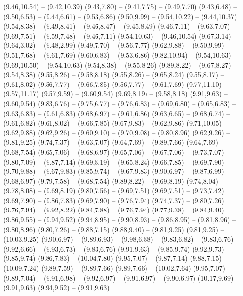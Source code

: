 {  (9.46,10.54) -- (9.42,10.39)
  (9.43,7.80) -- (9.41,7.75) -- (9.49,7.70)
  (9.43,6.48) -- (9.50,6.53) -- (9.44,6.61) -- (9.53,6.86)
  (9.50,9.99) -- (9.54,10.22) -- (9.44,10.37)
  (9.54,8.38) -- (9.49,8.41) -- (9.46,8.47) -- (9.45,8.49)
  (9.46,7.11) -- (9.63,7.07)
  (9.69,7.51) -- (9.59,7.48) -- (9.46,7.11)
  (9.54,10.63) -- (9.46,10.54)
  (9.67,3.14) -- (9.64,3.02) -- (9.48,2.99)
  (9.49,7.70) -- (9.56,7.77)
  (9.62,9.88) -- (9.50,9.99)
  (9.51,7.68) -- (9.61,7.69)
  (9.60,6.83) -- (9.53,6.86)
  (9.82,10.94) -- (9.54,10.63)
  (9.69,10.50) -- (9.54,10.63)
  (9.54,8.38) -- (9.55,8.26)
  (9.89,8.22) -- (9.67,8.27) -- (9.54,8.38)
  (9.55,8.26) -- (9.58,8.18)
  (9.55,8.26) -- (9.65,8.24)
  (9.55,8.17) -- (9.61,8.02)
  (9.56,7.77) -- (9.66,7.85)
  (9.56,7.77) -- (9.61,7.69)
  (9.77,11.10) -- (9.57,11.17)
  (9.57,9.59) -- (9.60,9.54)
  (9.69,8.19) -- (9.58,8.18)
  (9.91,9.63) -- (9.60,9.54)
  (9.83,6.76) -- (9.75,6.77) -- (9.76,6.83) -- (9.69,6.80) -- (9.65,6.83) -- (9.63,6.83) -- (9.61,6.83)
  (9.68,6.97) -- (9.61,6.86)
  (9.63,6.65) -- (9.68,6.74) -- (9.61,6.82)
  (9.61,8.02) -- (9.66,7.85)
  (9.67,9.83) -- (9.62,9.86)
  (9.71,10.05) -- (9.62,9.88)
  (9.62,9.26) -- (9.60,9.10) -- (9.70,9.08) -- (9.80,8.96)
  (9.62,9.26) -- (9.81,9.25)
  (9.74,7.37) -- (9.63,7.07)
  (9.64,7.69) -- (9.89,7.66)
  (9.64,7.69) -- (9.68,7.54)
  (9.65,7.06) -- (9.68,6.97)
  (9.65,7.06) -- (9.67,7.06) -- (9.73,7.07) -- (9.80,7.09) -- (9.87,7.14)
  (9.69,8.19) -- (9.65,8.24)
  (9.66,7.85) -- (9.69,7.90)
  (9.70,9.88) -- (9.67,9.83)
  (9.85,9.74) -- (9.67,9.83)
  (9.90,6.97) -- (9.87,6.99) -- (9.68,6.97)
  (9.79,7.58) -- (9.68,7.54)
  (9.89,8.22) -- (9.69,8.19)
  (9.74,8.04) -- (9.78,8.08) -- (9.69,8.19)
  (9.80,7.56) -- (9.69,7.51)
  (9.69,7.51) -- (9.73,7.42)
  (9.69,7.90) -- (9.86,7.83)
  (9.69,7.90) -- (9.76,7.94)
  (9.74,7.37) -- (9.80,7.26)
  (9.76,7.94) -- (9.92,8.22)
  (9.84,7.88) -- (9.76,7.94)
  (9.77,9.38) -- (9.84,9.40) -- (9.86,9.55) -- (9.94,9.52)
  (9.94,8.95) -- (9.90,8.93) -- (9.86,8.95) -- (9.81,8.96) -- (9.80,8.96)
  (9.80,7.26) -- (9.88,7.15)
  (9.88,9.40) -- (9.81,9.25)
  (9.81,9.25) -- (10.03,9.25)
  (9.90,6.97) -- (9.89,6.93) -- (9.98,6.88) -- (9.83,6.82) -- (9.83,6.76)
  (9.92,6.66) -- (9.93,6.73) -- (9.83,6.76)
  (9.91,9.63) -- (9.85,9.74)
  (9.92,9.73) -- (9.85,9.74)
  (9.86,7.83) -- (10.04,7.80)
  (9.95,7.07) -- (9.87,7.14)
  (9.88,7.15) -- (10.09,7.24)
  (9.89,7.59) -- (9.89,7.66)
  (9.89,7.66) -- (10.02,7.64)
  (9.95,7.07) -- (9.89,7.04) -- (9.91,6.98) -- (9.92,6.97) -- (9.91,6.97) -- (9.90,6.97)
  (10.17,9.69) -- (9.91,9.63)
  (9.94,9.52) -- (9.91,9.63)
}
